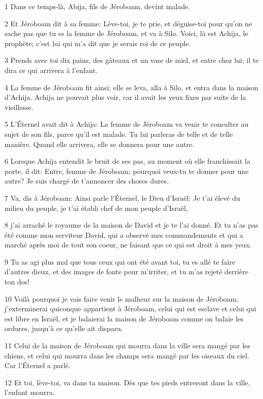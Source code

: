 \par 1 Dans ce temps-là, Abija, fils de Jéroboam, devint malade.
\par 2 Et Jéroboam dit à sa femme: Lève-toi, je te prie, et déguise-toi pour qu'on ne sache pas que tu es la femme de Jéroboam, et va à Silo. Voici, là est Achija, le prophète; c'est lui qui m'a dit que je serais roi de ce peuple.
\par 3 Prends avec toi dix pains, des gâteaux et un vase de miel, et entre chez lui; il te dira ce qui arrivera à l'enfant.
\par 4 La femme de Jéroboam fit ainsi; elle se leva, alla à Silo, et entra dans la maison d'Achija. Achija ne pouvait plus voir, car il avait les yeux fixes par suite de la vieillesse.
\par 5 L'Éternel avait dit à Achija: La femme de Jéroboam va venir te consulter au sujet de son fils, parce qu'il est malade. Tu lui parleras de telle et de telle manière. Quand elle arrivera, elle se donnera pour une autre.
\par 6 Lorsque Achija entendit le bruit de ses pas, au moment où elle franchissait la porte, il dit: Entre, femme de Jéroboam; pourquoi veux-tu te donner pour une autre? Je suis chargé de t'annoncer des choses dures.
\par 7 Va, dis à Jéroboam: Ainsi parle l'Éternel, le Dieu d'Israël: Je t'ai élevé du milieu du peuple, je t'ai établi chef de mon peuple d'Israël,
\par 8 j'ai arraché le royaume de la maison de David et je te l'ai donné. Et tu n'as pas été comme mon serviteur David, qui a observé mes commandements et qui a marché après moi de tout son coeur, ne faisant que ce qui est droit à mes yeux.
\par 9 Tu as agi plus mal que tous ceux qui ont été avant toi, tu es allé te faire d'autres dieux, et des images de fonte pour m'irriter, et tu m'as rejeté derrière ton dos!
\par 10 Voilà pourquoi je vais faire venir le malheur sur la maison de Jéroboam; j'exterminerai quiconque appartient à Jéroboam, celui qui est esclave et celui qui est libre en Israël, et je balaierai la maison de Jéroboam comme on balaie les ordures, jusqu'à ce qu'elle ait disparu.
\par 11 Celui de la maison de Jéroboam qui mourra dans la ville sera mangé par les chiens, et celui qui mourra dans les champs sera mangé par les oiseaux du ciel. Car l'Éternel a parlé.
\par 12 Et toi, lève-toi, va dans ta maison. Dès que tes pieds entreront dans la ville, l'enfant mourra.
